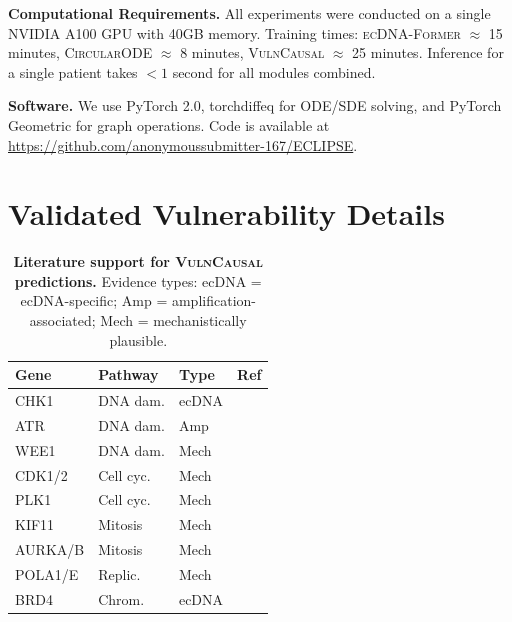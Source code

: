 \documentclass[sigconf,anonymous]{acmart}
\newcommand{\former}{\textsc{ecDNA-Former}}
\newcommand{\circularode}{\textsc{CircularODE}}
\newcommand{\vulncausal}{\textsc{VulnCausal}}
\begin{document}
\textbf{Computational Requirements.} All experiments were conducted on a single NVIDIA A100 GPU with 40GB memory. Training times: \former{} $\approx$ 15 minutes, \circularode{} $\approx$ 8 minutes, \vulncausal{} $\approx$ 25 minutes. Inference for a single patient takes $<1$ second for all modules combined.

\textbf{Software.} We use PyTorch 2.0, torchdiffeq for ODE/SDE solving, and PyTorch Geometric for graph operations. Code is available at \url{https://github.com/anonymoussubmitter-167/ECLIPSE}.


\section{Validated Vulnerability Details}
\label{app:vulnerabilities}

\begin{table}[h]
\caption{\textbf{Literature support for \vulncausal{} predictions.} Evidence types: ecDNA = ecDNA-specific; Amp = amplification-associated; Mech = mechanistically plausible.}
\label{tab:vuln_full}
\centering
\footnotesize
\begin{tabular}{@{}lllc@{}}
\toprule
Gene & Pathway & Type & Ref \\
\midrule
CHK1 & DNA dam. & ecDNA & \cite{yi_2024_chk1_ecdna} \\
ATR & DNA dam. & Amp & \cite{shen_2019_atr} \\
WEE1 & DNA dam. & Mech & \cite{otto_2017_cell_cycle} \\
CDK1/2 & Cell cyc. & Mech & \cite{otto_2017_cell_cycle} \\
PLK1 & Cell cyc. & Mech & \cite{gutteridge_2016_plk1} \\
KIF11 & Mitosis & Mech & \cite{zhou_2021_kif11} \\
AURKA/B & Mitosis & Mech & \cite{wilkinson_2007_aurkb} \\
POLA1/E & Replic. & Mech & \cite{macheret_2020_replication} \\
BRD4 & Chrom. & ecDNA & \cite{hung_2021_ecdna_hubs} \\
\bottomrule
\end{tabular}
\end{table}
\end{document}
